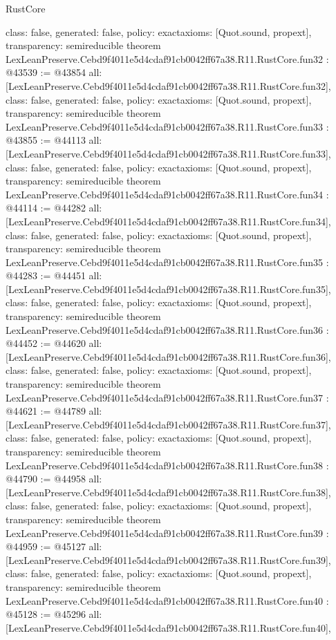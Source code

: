 \begin{lexlean}{RustCore}
\begin{coremodule}
{  class: false,
  generated: false,
  policy: exact{axioms: [Quot.sound, propext]},
  transparency: semireducible
}
theorem LexLeanPreserve.Cebd9f4011e5d4cdaf91cb0042ff67a38.R11.RustCore.fun32 : @43539 := @43854 {
  all: [LexLeanPreserve.Cebd9f4011e5d4cdaf91cb0042ff67a38.R11.RustCore.fun32],
  class: false,
  generated: false,
  policy: exact{axioms: [Quot.sound, propext]},
  transparency: semireducible
}
theorem LexLeanPreserve.Cebd9f4011e5d4cdaf91cb0042ff67a38.R11.RustCore.fun33 : @43855 := @44113 {
  all: [LexLeanPreserve.Cebd9f4011e5d4cdaf91cb0042ff67a38.R11.RustCore.fun33],
  class: false,
  generated: false,
  policy: exact{axioms: [Quot.sound, propext]},
  transparency: semireducible
}
theorem LexLeanPreserve.Cebd9f4011e5d4cdaf91cb0042ff67a38.R11.RustCore.fun34 : @44114 := @44282 {
  all: [LexLeanPreserve.Cebd9f4011e5d4cdaf91cb0042ff67a38.R11.RustCore.fun34],
  class: false,
  generated: false,
  policy: exact{axioms: [Quot.sound, propext]},
  transparency: semireducible
}
theorem LexLeanPreserve.Cebd9f4011e5d4cdaf91cb0042ff67a38.R11.RustCore.fun35 : @44283 := @44451 {
  all: [LexLeanPreserve.Cebd9f4011e5d4cdaf91cb0042ff67a38.R11.RustCore.fun35],
  class: false,
  generated: false,
  policy: exact{axioms: [Quot.sound, propext]},
  transparency: semireducible
}
theorem LexLeanPreserve.Cebd9f4011e5d4cdaf91cb0042ff67a38.R11.RustCore.fun36 : @44452 := @44620 {
  all: [LexLeanPreserve.Cebd9f4011e5d4cdaf91cb0042ff67a38.R11.RustCore.fun36],
  class: false,
  generated: false,
  policy: exact{axioms: [Quot.sound, propext]},
  transparency: semireducible
}
theorem LexLeanPreserve.Cebd9f4011e5d4cdaf91cb0042ff67a38.R11.RustCore.fun37 : @44621 := @44789 {
  all: [LexLeanPreserve.Cebd9f4011e5d4cdaf91cb0042ff67a38.R11.RustCore.fun37],
  class: false,
  generated: false,
  policy: exact{axioms: [Quot.sound, propext]},
  transparency: semireducible
}
theorem LexLeanPreserve.Cebd9f4011e5d4cdaf91cb0042ff67a38.R11.RustCore.fun38 : @44790 := @44958 {
  all: [LexLeanPreserve.Cebd9f4011e5d4cdaf91cb0042ff67a38.R11.RustCore.fun38],
  class: false,
  generated: false,
  policy: exact{axioms: [Quot.sound, propext]},
  transparency: semireducible
}
theorem LexLeanPreserve.Cebd9f4011e5d4cdaf91cb0042ff67a38.R11.RustCore.fun39 : @44959 := @45127 {
  all: [LexLeanPreserve.Cebd9f4011e5d4cdaf91cb0042ff67a38.R11.RustCore.fun39],
  class: false,
  generated: false,
  policy: exact{axioms: [Quot.sound, propext]},
  transparency: semireducible
}
theorem LexLeanPreserve.Cebd9f4011e5d4cdaf91cb0042ff67a38.R11.RustCore.fun40 : @45128 := @45296 {
  all: [LexLeanPreserve.Cebd9f4011e5d4cdaf91cb0042ff67a38.R11.RustCore.fun40],
}
\end{coremodule}
\end{lexlean}
